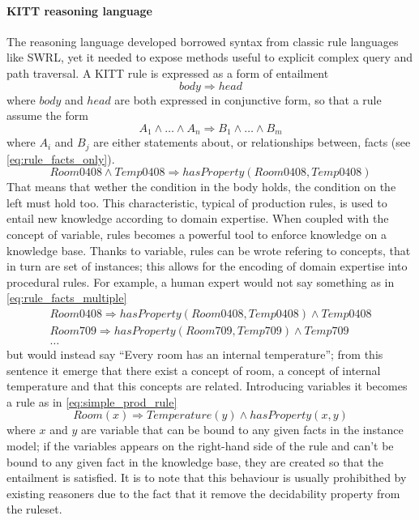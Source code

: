 \paragraph{KITT reasoning language}
The reasoning language developed borrowed syntax from classic rule languages like SWRL, yet it needed to expose methods useful to explicit complex query and path traversal. A KITT rule is expressed as a form of entailment \[body\Rightarrow head\] where $body$ and $head$ are both expressed in conjunctive form, so that a rule assume the form \[A_1\land\ldots\land A_n\Rightarrow B_1\land\ldots\land B_m\] where $A_i$ and $B_j$ are either statements about, or relationships between, facts (see \autoref{eq:rule_facts_only}).
\begin{equation}
\label{eq:rule_facts_only}
Room0408\land Temp0408\Rightarrow hasProperty(Room0408, Temp0408)
\end{equation}
That means that wether the condition in the body holds, the condition on the left must hold too. This characteristic, typical of production rules, is used to entail new knowledge according to domain expertise. When coupled with the concept of variable, rules becomes a powerful tool to enforce knowledge on a knowledge base. Thanks to variable, rules can be wrote refering to concepts, that in turn are set of instances; this allows for the encoding of domain expertise into procedural rules. For example, a human expert would not say something as in \ref{eq:rule_facts_multiple}
\begin{equation}
\label{eq:rule_facts_multiple}
\begin{gathered}
Room0408\Rightarrow hasProperty(Room0408, Temp0408)\land Temp0408\\
Room709\Rightarrow hasProperty(Room709, Temp709)\land Temp709\\
\dots
\end{gathered}
\end{equation}
but would instead say ``Every room has an internal temperature''; from this sentence it emerge that there exist a concept of room, a concept of internal temperature and that this concepts are related. Introducing variables it becomes a rule as in \autoref{eq:simple_prod_rule}
\begin{equation}
\label{eq:simple_prod_rule}
Room(x)\Rightarrow Temperature(y)\land hasProperty(x,y)
\end{equation}
where $x$ and $y$ are variable that can be bound to any given facts in the instance model; if  the variables appears on the right-hand side of the rule and can't be bound to any given fact in the knowledge base, they are created so that the entailment is satisfied. It is to note that this behaviour is usually prohibithed by existing reasoners due to the fact that it remove the decidability property from the ruleset.
